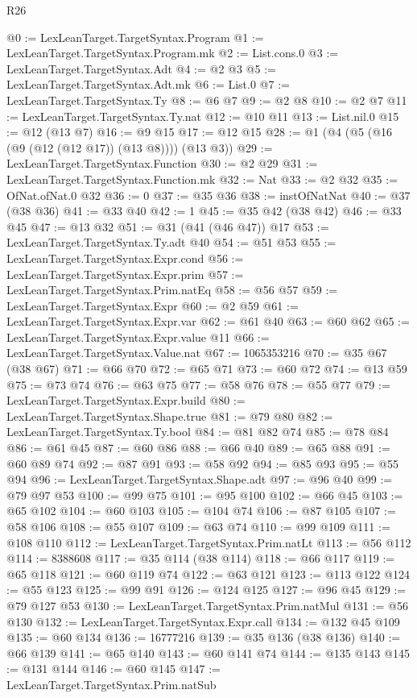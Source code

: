 \begin{lexlean}{R26}
\begin{coremodule}
@0 := LexLeanTarget.TargetSyntax.Program
@1 := LexLeanTarget.TargetSyntax.Program.mk
@2 := List.cons.{0}
@3 := LexLeanTarget.TargetSyntax.Adt
@4 := @2 @3
@5 := LexLeanTarget.TargetSyntax.Adt.mk
@6 := List.{0}
@7 := LexLeanTarget.TargetSyntax.Ty
@8 := @6 @7
@9 := @2 @8
@10 := @2 @7
@11 := LexLeanTarget.TargetSyntax.Ty.nat
@12 := @10 @11
@13 := List.nil.{0}
@15 := @12 (@13 @7)
@16 := @9 @15
@17 := @12 @15
@28 := @1 (@4 (@5 (@16 (@9 (@12 (@12 @17)) (@13 @8)))) (@13 @3))
@29 := LexLeanTarget.TargetSyntax.Function
@30 := @2 @29
@31 := LexLeanTarget.TargetSyntax.Function.mk
@32 := Nat
@33 := @2 @32
@35 := OfNat.ofNat.{0} @32
@36 := 0
@37 := @35 @36
@38 := instOfNatNat
@40 := @37 (@38 @36)
@41 := @33 @40
@42 := 1
@45 := @35 @42 (@38 @42)
@46 := @33 @45
@47 := @13 @32
@51 := @31 (@41 (@46 @47)) @17
@53 := LexLeanTarget.TargetSyntax.Ty.adt @40
@54 := @51 @53
@55 := LexLeanTarget.TargetSyntax.Expr.cond
@56 := LexLeanTarget.TargetSyntax.Expr.prim
@57 := LexLeanTarget.TargetSyntax.Prim.natEq
@58 := @56 @57
@59 := LexLeanTarget.TargetSyntax.Expr
@60 := @2 @59
@61 := LexLeanTarget.TargetSyntax.Expr.var
@62 := @61 @40
@63 := @60 @62
@65 := LexLeanTarget.TargetSyntax.Expr.value @11
@66 := LexLeanTarget.TargetSyntax.Value.nat
@67 := 1065353216
@70 := @35 @67 (@38 @67)
@71 := @66 @70
@72 := @65 @71
@73 := @60 @72
@74 := @13 @59
@75 := @73 @74
@76 := @63 @75
@77 := @58 @76
@78 := @55 @77
@79 := LexLeanTarget.TargetSyntax.Expr.build
@80 := LexLeanTarget.TargetSyntax.Shape.true
@81 := @79 @80
@82 := LexLeanTarget.TargetSyntax.Ty.bool
@84 := @81 @82 @74
@85 := @78 @84
@86 := @61 @45
@87 := @60 @86
@88 := @66 @40
@89 := @65 @88
@91 := @60 @89 @74
@92 := @87 @91
@93 := @58 @92
@94 := @85 @93
@95 := @55 @94
@96 := LexLeanTarget.TargetSyntax.Shape.adt
@97 := @96 @40
@99 := @79 @97 @53
@100 := @99 @75
@101 := @95 @100
@102 := @66 @45
@103 := @65 @102
@104 := @60 @103
@105 := @104 @74
@106 := @87 @105
@107 := @58 @106
@108 := @55 @107
@109 := @63 @74
@110 := @99 @109
@111 := @108 @110
@112 := LexLeanTarget.TargetSyntax.Prim.natLt
@113 := @56 @112
@114 := 8388608
@117 := @35 @114 (@38 @114)
@118 := @66 @117
@119 := @65 @118
@121 := @60 @119 @74
@122 := @63 @121
@123 := @113 @122
@124 := @55 @123
@125 := @99 @91
@126 := @124 @125
@127 := @96 @45
@129 := @79 @127 @53
@130 := LexLeanTarget.TargetSyntax.Prim.natMul
@131 := @56 @130
@132 := LexLeanTarget.TargetSyntax.Expr.call
@134 := @132 @45 @109
@135 := @60 @134
@136 := 16777216
@139 := @35 @136 (@38 @136)
@140 := @66 @139
@141 := @65 @140
@143 := @60 @141 @74
@144 := @135 @143
@145 := @131 @144
@146 := @60 @145
@147 := LexLeanTarget.TargetSyntax.Prim.natSub

\end{coremodule}
\end{lexlean}
